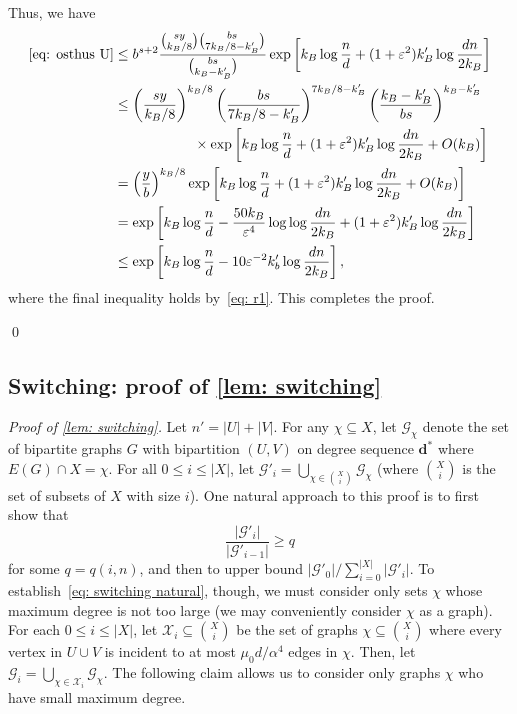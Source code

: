 \documentclass[11pt]{article}
\newcommand{\eps}{\varepsilon}
\theoremstyle{plain}
\begin{document}
Thus, we have
{\allowdisplaybreaks \begin{align}
    \text{\eqref{eq: osthus U}} &\leq b^{s + 2}\frac{\binom{sy}{k_B/8}\binom{bs}{7k_B/8 - k'_B}}{\binom{bs}{k_B- k'_B}}\exp\left[k_B\log\frac
    nd + (1 + \eps^2)k'_B\log\frac{dn}{2k_B}\right]\notag\\
    &\leq \left(\frac{sy}{k_B/8}\right)^{k_B/8}\left(\frac{bs}{7k_B/8 - k'_B}\right)^{7k_B/8 - k'_B}\left(\frac{k_B - k'_B}{bs}\right)^{k_B - k'_B}\notag\\&\hspace{2cm}\times\exp\left[k_B\log\frac{n}{d} + (1 + \eps^2)k'_B\log\frac{dn}{2k_B} + O(k_B)\right]\notag\\
    &= \left(\frac{y}{b}\right)^{k_B/8}\exp\left[k_B\log\frac{n}{d} + (1 + \eps^2)k'_B\log\frac{dn}{2k_B} + O(k_B)\right]\notag\\
    &= \exp\left[k_B \log\frac{n}{d}-\frac{50k_B}{\eps^4}\log\log\frac{dn}{2k_B} + (1 + \eps^2)k'_B\log\frac{dn}{2k_B}\right]\notag\\
    &\leq \exp\left[k_B\log\frac{n}{d} - 10\eps^{-2}k'_b\log\frac{dn}{2k_B}\right],\notag
\end{align}}
where the final inequality holds by~\eqref{eq: r1}. This completes the proof.

\qed

\subsection{Switching: proof of \cref{lem: switching}}\label{sec: subswitching}

\noindent\textit{Proof of \cref{lem: switching}.}
    Let $n' = |U| + |V|$. For any $\chi \subseteq X$, let $\mathcal G_{\chi}$ denote the set of bipartite graphs $G$ with bipartition $(U,V)$ on degree sequence $\mathbf d^*$ where $E(G) \cap X = \chi$. For all $0 \leq i \leq |X|$, let $\mathcal G'_i = \bigcup_{\chi \in \binom{X}{i}} \mathcal G_\chi$ (where $\binom{X}{i}$ is the set of subsets of $X$ with size $i$). One natural approach to this proof is to first show that 
    \begin{equation}\label{eq: switching natural}
        \frac{|\mathcal G'_{i}|}{|\mathcal G'_{i-1}|} \geq q
    \end{equation}
    for some $q = q(i,n)$, and then to upper bound $|\mathcal G'_0|/\sum_{i = 0}^{|X|}|\mathcal G'_i|$. To establish~\eqref{eq: switching natural}, though, we must consider only sets $\chi$ whose maximum degree is not too large (we may conveniently consider $\chi$ as a graph). For each $0 \leq i \leq |X|$, let $\mathcal X_i \subseteq \binom{X}{i}$ be the set of graphs $\chi \subseteq \binom{X}{i}$ where every vertex in $U \cup V$ is incident to at most $\mu_0d/\alpha^4$ edges in $\chi$. Then, let $\mathcal G_i = \bigcup_{\chi \in \mathcal X_i}\mathcal G_{\chi}$. The following claim allows us to consider only graphs $\chi$ who have small maximum degree.
    
\end{document}
